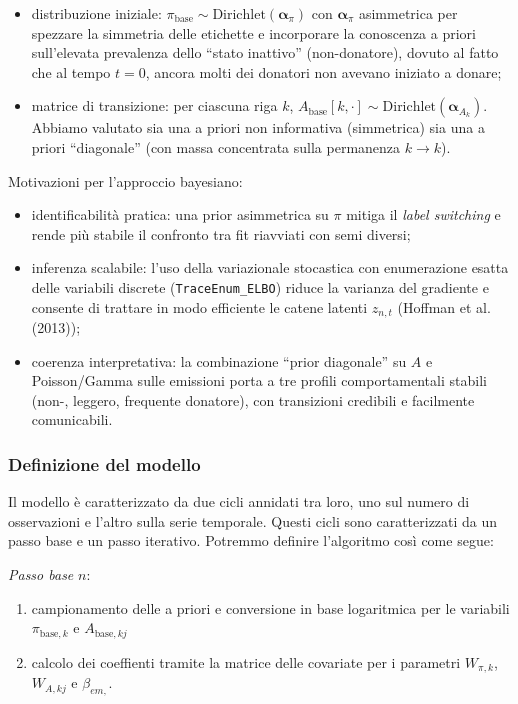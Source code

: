 \documentclass[
  italian,
  a4paper,
  a4paper,
  twoside,
  open=right,
  12pt]{scrbook}
\theoremstyle{definition}
\theoremstyle{remark}
\begin{document}
\begin{itemize}
\item
  distribuzione iniziale:
  \(\pi_{\text{base}} \sim \text{Dirichlet}(\boldsymbol{\alpha}_\pi)\)
  con \(\boldsymbol{\alpha}_\pi\) asimmetrica per spezzare la simmetria
  delle etichette e incorporare la conoscenza a priori sull'elevata
  prevalenza dello ``stato inattivo'' (non-donatore), dovuto al fatto
  che al tempo \(t=0\), ancora molti dei donatori non avevano iniziato a
  donare;
\item
  matrice di transizione: per ciascuna riga \(k\),
  \(A_{\text{base}}[k,\cdot] \sim \text{Dirichlet}(\boldsymbol{\alpha}_{A_k})\).
  Abbiamo valutato sia una a priori non informativa (simmetrica) sia una
  a priori ``diagonale'' (con massa concentrata sulla permanenza
  \(k \to k\)).
\end{itemize}

Motivazioni per l'approccio bayesiano:

\begin{itemize}
\item
  identificabilità pratica: una prior asimmetrica su \(\pi\) mitiga il
  \emph{label switching} e rende più stabile il confronto tra fit
  riavviati con semi diversi;
\item
  inferenza scalabile: l'uso della variazionale stocastica con
  enumerazione esatta delle variabili discrete
  (\texttt{TraceEnum\_ELBO}) riduce la varianza del gradiente e consente
  di trattare in modo efficiente le catene latenti \(z_{n,t}\) (Hoffman
  et al. (2013));
\item
  coerenza interpretativa: la combinazione ``prior diagonale'' su \(A\)
  e Poisson/Gamma sulle emissioni porta a tre profili comportamentali
  stabili (non-, leggero, frequente donatore), con transizioni credibili
  e facilmente comunicabili.
\end{itemize}

\subsubsection{Definizione del modello}\label{sec-def_modello}

Il modello è caratterizzato da due cicli annidati tra loro, uno sul
numero di osservazioni e l'altro sulla serie temporale. Questi cicli
sono caratterizzati da un passo base e un passo iterativo. Potremmo
definire l'algoritmo così come segue:

\emph{Passo base} \(n\):

\begin{enumerate}
\def\labelenumi{\arabic{enumi}.}
\item
  campionamento delle a priori e conversione in base logaritmica per le
  variabili \(\pi_{\text{base},k}\) e \(A_{\text{base},kj}\)
\item
  calcolo dei coeffienti tramite la matrice delle covariate per i
  parametri \(W_{\pi,k}\), \(W_{A,kj}\) e \(\beta_{em,}\).
\end{enumerate}
\end{document}
